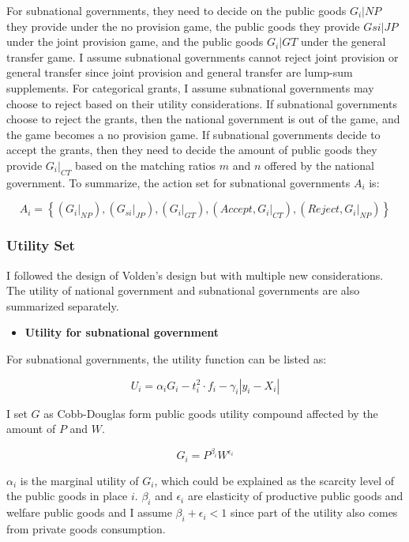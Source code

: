 \documentclass[man]{apa7}
\begin{document}
For subnational governments, they need to decide on the public goods $G_i|{NP}$ they provide under the no provision game, the public goods they provide $G{si}|{JP}$ under the joint provision game, and the public goods $G_i|{GT}$ under the general transfer game. I assume subnational governments cannot reject joint provision or general transfer since joint provision and general transfer are lump-sum supplements. For categorical grants, I assume subnational governments may choose to reject based on their utility considerations. If subnational governments choose to reject the grants, then the national government is out of the game, and the game becomes a no provision game. If subnational governments decide to accept the grants, then they need to decide the amount of public goods they provide $G_i|_{CT}$ based on the matching ratios $m$ and $n$ offered by the national government. To summarize, the action set for subnational governments $A_i$ is:

$$A_i=\left\{\left(G_i|_{NP}\right),\left(G_{si}|_{JP} \right),\left(G_i|_{GT} \right),\left(Accept,G_i|_{CT}\right), (Reject,G_i|_{NP})\right\} $$

\subsubsection{Utility Set}

I followed the design of Volden's design but with multiple new considerations. The utility of national government and subnational governments are also summarized separately.
\begin{itemize}
  \item \textbf{Utility for subnational government}
\end{itemize}

For subnational governments, the utility function can be listed as:

\begin{equation}
  U_i=\alpha_i G_i-t_{i}^2\cdot f_i-\gamma_i\left|y_i-X_i\right|
\end{equation}

I set $G$ as  Cobb-Douglas form public goods utility compound affected by the amount of $P$ and $W$.

\begin{equation}
  G_i= P^{\beta_i} W^{\epsilon_i}\label{pgmatrix}
\end{equation}

$\alpha_i$ is the marginal utility of $G_i$, which could be explained as the scarcity level of the public goods in place $i$. $\beta_i$ and $\epsilon_i$ are elasticity of productive public goods and welfare public goods and I assume $\beta_i + \epsilon_i<1 $ since part of the utility also comes from private goods consumption.
\end{document}
